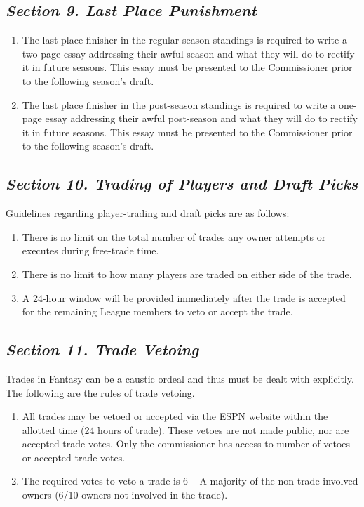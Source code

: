 \documentclass{article}
\begin{document}
    \subsection{\textit{Section 9. Last Place Punishment}}
    \begin{enumerate}[label=\Alph*)]
        \item The last place finisher in the regular season standings is required to write a two-page essay addressing their awful season and what they will do to rectify it in future seasons. This essay must be presented to the Commissioner prior to the following season's draft.
        \item The last place finisher in the post-season standings is required to write a one-page essay addressing their awful post-season and what they will do to rectify it in future seasons. This essay must be presented to the Commissioner prior to the following season's draft.
    \end{enumerate}
    \subsection{\textit{Section 10. Trading of Players and Draft Picks}}
    Guidelines regarding player-trading and draft picks are as follows:
    \begin{enumerate}[label=\Alph*)]
        \item There is no limit on the total number of trades any owner attempts or executes during free-trade time.
        \item There is no limit to how many players are traded on either side of the trade.
        \item A 24-hour window will be provided immediately after the trade is accepted for the remaining League members to veto or accept the trade.
    \end{enumerate}
    \subsection{\textit{Section 11. Trade Vetoing}}
    Trades in Fantasy can be a caustic ordeal and thus must be dealt with explicitly. The following are the rules of trade vetoing.
    \begin{enumerate}[label=\Alph*)]
        \item All trades may be vetoed or accepted via the ESPN website within the allotted time (24 hours of trade). These vetoes are not made public, nor are accepted trade votes. Only the commissioner has access to number of vetoes or accepted trade votes.
        \item The required votes to veto a trade is 6 – A majority of the non-trade involved owners (6/10 owners not involved in the trade).
    \end{enumerate}
\end{document}
